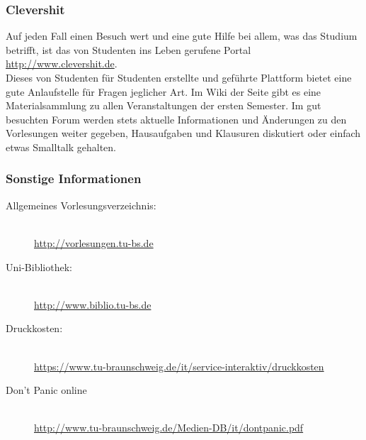 	\subsubsection{Clevershit}

		Auf jeden Fall einen Besuch wert und eine gute Hilfe bei allem, was das Studium betrifft, ist das von Studenten ins Leben gerufene Portal \mbox{\url{http://www.clevershit.de}}.\\
		Dieses von Studenten für Studenten erstellte und geführte Plattform bietet eine gute Anlaufstelle für Fragen jeglicher Art. Im Wiki der Seite gibt es eine Materialsammlung zu allen Veranstaltungen der ersten Semester. Im gut besuchten Forum werden stets aktuelle Informationen und Änderungen zu den Vorlesungen weiter gegeben, Hausaufgaben und Klausuren diskutiert oder einfach etwas Smalltalk gehalten.

\subsubsection*{Sonstige Informationen}
	\begin{description}
		\item[Allgemeines Vorlesungsverzeichnis:] ~\\
			{\footnotesize\url{http://vorlesungen.tu-bs.de}}
		\item[Uni-Bibliothek:] ~\\
			{\footnotesize\url{http://www.biblio.tu-bs.de}}
		\item[Druckkosten:] ~\\
			{\footnotesize\url{https://www.tu-braunschweig.de/it/service-interaktiv/druckkosten}}
		\item[Don't Panic online] ~\\
			{\footnotesize\url{http://www.tu-braunschweig.de/Medien-DB/it/dontpanic.pdf}}
	\end{description}
